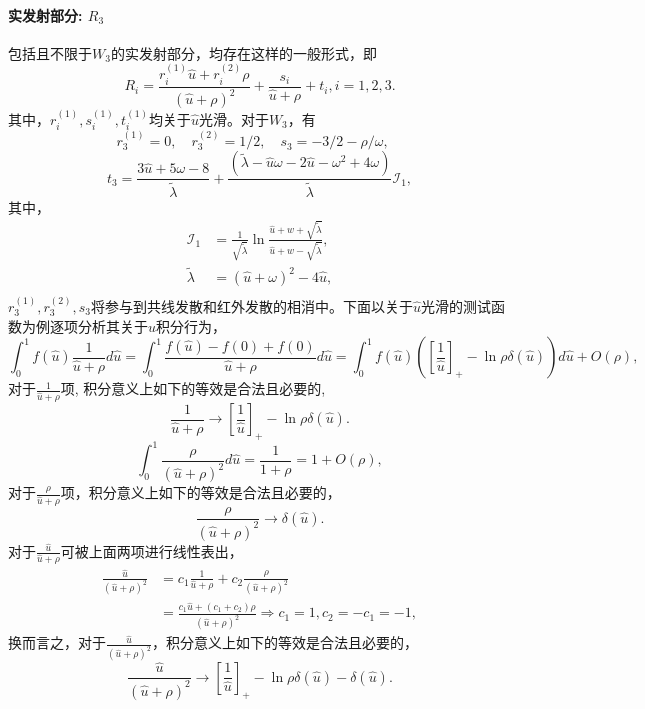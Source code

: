 \paragraph{实发射部分: $R_{3}$}  包括且不限于$W_{3}$的实发射部分，均存在这样的一般形式，即$$R_i=\frac{r_i^{(1)} \hat{u}+r_i^{(2)} \rho}{(\hat{u}+\rho)^2}+\frac{s_i}{\hat{u}+\rho}+t_i,i=1, 2, 3.$$
其中，$r_{i}^{(1)}, s_{i}^{(1)}, t_{i}^{(1)}$均关于$\hat{u}$光滑。对于$W_{3}$，有
\begin{equation}
        r_{3}^{(1)}=0,\quad
        r_{3}^{(2)}=1/2,\quad
        s_{3}=-3/2-\rho/\omega,\quad
\end{equation}
$$ t_{3}=\frac{3 \hat{u}+5 \omega -8}{\tilde{\lambda }}+\frac{\left(\tilde{\lambda }-\hat{u} \omega -2 \hat{u}-\omega ^2+4 \omega \right)}{\tilde{\lambda }}\mathcal{I}_1,$$
其中，
\begin{equation}
    \begin{aligned}
        \mathcal{I}_1&=\frac{1}{\sqrt{\tilde{\lambda}}} \ln \frac{\hat{u}+w+\sqrt{\tilde{\lambda}}}{\hat{u}+w-\sqrt{\tilde{\lambda}}},\\
        \tilde{\lambda}&=(\hat{u}+\omega)^2-4 \hat{u},\\
    \end{aligned}
    \end{equation}
$r_{3}^{(1)},r_{3}^{(2)}, s_{3}$将参与到共线发散和红外发散的相消中。下面以关于$\hat{u}$光滑的测试函数为例逐项分析其关于$\hat{u}$积分行为，
\begin{equation}
    \int_0^1 f(\hat{u}) \frac{1}{\hat{u}+\rho} d \hat{u}=\int_0^1 \frac{f(\hat{u})-f(0)+f(0)}{\hat{u}+\rho} d \hat{u}=\int_0^1 f(\hat{u})\left(\left[\frac{1}{\hat{u}}\right]_{+}-\ln \rho \delta(\hat{u})\right) d \hat{u}+O(\rho),
    \label{eq:pd1}
\end{equation}
对于$\frac{1}{\hat{u}+\rho}$项, 积分意义上如下的等效是合法且必要的,
$$
\frac{1}{\hat{u}+\rho} \rightarrow\left[\frac{1}{\hat{u}}\right]_{+}-\ln \rho \delta(\hat{u}).
$$
\begin{equation}
    \int_0^1 \frac{\rho}{(\hat{u}+\rho)^2} d \hat{u}=\frac{1}{1+\rho}=1+O(\rho),
    \label{eq:pd2}
\end{equation}
对于$\frac{\rho}{\hat{u}+\rho}$项，积分意义上如下的等效是合法且必要的，
    $$
\frac{\rho}{(\hat{u}+\rho)^2} \rightarrow \delta(\hat{u}).
$$
对于$\frac{\hat{u}}{\hat{u}+\rho}$可被上面两项进行线性表出，
\begin{equation}
    \begin{aligned}
    \frac{\hat{u}}{(\hat{u}+\rho)^2} & =c_1 \frac{1}{\hat{u}+\rho}+c_2 \frac{\rho}{(\hat{u}+\rho)^2} \\
    & =\frac{c_1 \hat{u}+\left(c_1+c_2\right) \rho}{(\hat{u}+\rho)^2} \Rightarrow c_1=1, c_2=-c_1=-1,
    \end{aligned}
    \label{eq:pd3}
\end{equation}
换而言之，对于$\frac{\hat{u}}{(\hat{u}+\rho)^2}$，积分意义上如下的等效是合法且必要的，
$$
\frac{\hat{u}}{(\hat{u}+\rho)^2}\rightarrow\left[\frac{1}{\hat{u}}\right]_{+}-\ln \rho \delta(\hat{u})-\delta(\hat{u}).
$$

